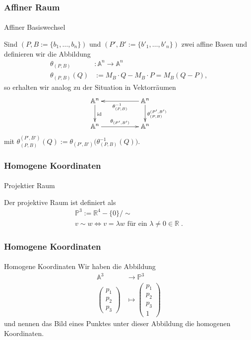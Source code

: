 \documentclass{beamer}
\begin{document}
\begin{frame}
    \frametitle{Affiner Raum}
\framesubtitle{}
\begin{block}{Affiner Basiswechsel}

Sind $(P,B:= \{b_1, \hdots , b_n \})$  und $(P',B':= \{b'_1, \hdots , b'_n \})$ zwei affine Basen  und definieren wir 
die Abbildung
\begin{align*}
\theta_{(P,B)} & :  \mathbb{A}^n \to \mathbb{A}^n \\
\theta_{(P,B)}(Q) & := M_B \cdot Q - M_B \cdot P  =  M_B (Q -  P ),
\end{align*}
so erhalten wir analog zu der Situation in Vektorräumen
\begin{align*}
\xymatrix{
\mathbb{A}^n  \ar[d]^{\text{id}} &  & \ar[ll]^{\theta_{(P,B)}^{-1}} \mathbb{A}^n \ar[d]^{\theta_{(P,B)}^{(P',B')}} \\
\mathbb{A}^n  \ar[rr]^{\theta_{(P',B')}} & &  \mathbb{A}^n
}
\end{align*}
mit $\theta_{(P,B)}^{(P',B')} (Q) :=   \theta_{(P',B')} \biggl ( \theta_{(P,B)}^{-1} (Q) \biggr)$.
\end{block}

\end{frame}



\begin{frame}
    \frametitle{Homogene Koordinaten}
\framesubtitle{}
\begin{block}{Projektier Raum}

Der projektive  Raum ist definiert als
\begin{align*}
\mathbb{P}^3 := \mathbb{R}^{4} - \{ 0\} / \sim \\
v \sim w \Leftrightarrow v = \lambda w \text{ für ein } \lambda \neq 0 \in \mathbb{R} \; . 
\end{align*}
\end{block}
\end{frame}

\begin{frame}
    \frametitle{Homogene Koordinaten}
\framesubtitle{}
\begin{block}{Homogene Koordinaten}
Wir haben die Abbildung
\begin{align*}
\mathbb{A}^3 & \to \mathbb{P}^3 \\
\begin{pmatrix} p_1 \\ p_2 \\ p_3 \end{pmatrix} & \mapsto \begin{pmatrix} p_1 \\ p_2 \\ p_3  \\  1\end{pmatrix} 
\end{align*}
und nennen das Bild eines Punktes unter dieser Abbildung die homogenen Koordinaten.
\end{block}
\end{frame}
\end{document}
